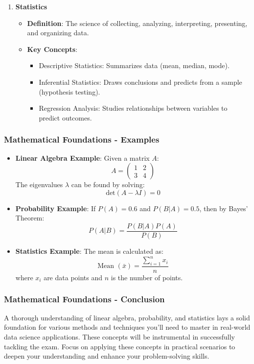 \documentclass[aspectratio=169]{beamer}
\begin{document}
\begin{frame}[fragile]
\begin{enumerate}
        \item \textbf{Statistics}
        \begin{itemize}
            \item \textbf{Definition}: The science of collecting, analyzing, interpreting, presenting, and organizing data.
            \item \textbf{Key Concepts}:
                \begin{itemize}
                    \item Descriptive Statistics: Summarizes data (mean, median, mode).
                    \item Inferential Statistics: Draws conclusions and predicts from a sample (hypothesis testing).
                    \item Regression Analysis: Studies relationships between variables to predict outcomes.
                \end{itemize}
        \end{itemize}
    \end{enumerate}
\end{frame}

\begin{frame}[fragile]
    \frametitle{Mathematical Foundations - Examples}
    \begin{itemize}
        \item \textbf{Linear Algebra Example}:
        Given a matrix \( A \):
        \[
        A = \begin{pmatrix} 1 & 2 \\ 3 & 4 \end{pmatrix}
        \]
        The eigenvalues \( \lambda \) can be found by solving:
        \[
        \text{det}(A - \lambda I) = 0
        \]

        \item \textbf{Probability Example}:
        If \( P(A) = 0.6 \) and \( P(B|A) = 0.5 \), then by Bayes’ Theorem:
        \[
        P(A|B) = \frac{P(B|A) P(A)}{P(B)}
        \]

        \item \textbf{Statistics Example}:
        The mean is calculated as:
        \[
        \text{Mean } (\bar{x}) = \frac{\sum_{i=1}^{n} x_i}{n}
        \]
        where \( x_i \) are data points and \( n \) is the number of points.
    \end{itemize}
\end{frame}

\begin{frame}[fragile]
    \frametitle{Mathematical Foundations - Conclusion}
    A thorough understanding of linear algebra, probability, and statistics lays a solid foundation for various methods and techniques you'll need to master in real-world data science applications.  
    These concepts will be instrumental in successfully tackling the exam.  
    Focus on applying these concepts in practical scenarios to deepen your understanding and enhance your problem-solving skills.
\end{frame}
\end{document}
